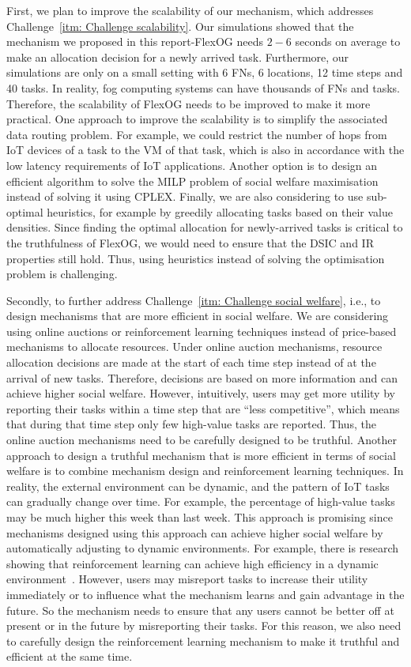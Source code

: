 \documentclass[11pt]{phdthesis}
\begin{document}
First, we plan to improve the scalability of our mechanism, which addresses Challenge~\ref{itm: Challenge scalability}. Our simulations showed that the mechanism we proposed in this report-FlexOG needs
	$ 2-6 $ seconds on average to make an allocation decision for a newly arrived task. Furthermore, our simulations are only on a small setting with 6 FNs, 6 locations, 12 time steps and 40 tasks. In reality, fog computing systems can have thousands of FNs and tasks. Therefore, the scalability of FlexOG needs to be improved to make it more practical. One approach to improve the scalability is to simplify the associated data routing problem. For example, we could restrict the number of hops from IoT devices of a task to the VM of that task, which is also in accordance with the low latency requirements of IoT applications. Another option is to design an efficient algorithm to solve the MILP problem of social welfare maximisation instead of solving it using CPLEX. Finally, we are also considering to use sub-optimal heuristics, for example by greedily allocating tasks based on their value densities. Since finding the optimal allocation for newly-arrived tasks is critical to the truthfulness of FlexOG, we would need to ensure that the DSIC and IR properties still hold. Thus, using heuristics instead of solving the optimisation problem is challenging.
	
    Secondly, to further address Challenge~\ref{itm: Challenge social welfare}, i.e., to design mechanisms that are more efficient in social welfare. We are considering using online auctions or reinforcement learning techniques instead of price-based mechanisms to allocate resources. Under online auction mechanisms, resource allocation decisions are made at the start of each time step instead of at the arrival of new tasks. Therefore, decisions are based on more information and can achieve higher social welfare. However, intuitively, users may get more utility by reporting their tasks within a time step that are ``less competitive'', which means that during that time step only few high-value tasks are reported. Thus, the online auction mechanisms need to be carefully designed to be truthful. Another approach to design a truthful mechanism that is more efficient in terms of social welfare is to combine mechanism design and reinforcement learning techniques. In reality, the external environment can be dynamic, and the pattern of IoT tasks can gradually change over time. For example, the percentage of high-value tasks may be much higher this week than last week. This approach is promising since mechanisms designed using this approach can achieve higher social welfare by automatically adjusting to dynamic environments. For example, there is research showing that reinforcement learning can achieve high efficiency in a dynamic environment~\citep{aydin2000dynamic,cui2017reinforcement}. However, users may misreport tasks to increase their utility immediately or to influence what the mechanism learns and gain advantage in the future. So the mechanism needs to ensure that any users cannot be better off at present or in the future by misreporting their tasks. For this reason, we also need to carefully design the reinforcement learning mechanism to make it truthful and efficient at the same time. 
	
\end{document}
